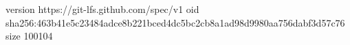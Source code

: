 version https://git-lfs.github.com/spec/v1
oid sha256:463b41e5c23484adce8b221bced4dc5bc2cb8a1ad98d9980aa756dabf3d57c76
size 100104
